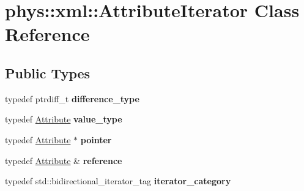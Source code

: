 \hypertarget{classphys_1_1xml_1_1AttributeIterator}{
\section{phys::xml::AttributeIterator Class Reference}
\label{de/d78/classphys_1_1xml_1_1AttributeIterator}
}
\subsection*{Public Types}
\begin{DoxyCompactItemize}
\item 
\hypertarget{classphys_1_1xml_1_1AttributeIterator_a04d891c0ff2a2122b8122dd872e4237e}{
typedef ptrdiff\_\-t {\bfseries difference\_\-type}}
\label{de/d78/classphys_1_1xml_1_1AttributeIterator_a04d891c0ff2a2122b8122dd872e4237e}

\item 
\hypertarget{classphys_1_1xml_1_1AttributeIterator_a686c1153e4f2c76a47b9160751cf4ebf}{
typedef \hyperlink{classphys_1_1xml_1_1Attribute}{Attribute} {\bfseries value\_\-type}}
\label{de/d78/classphys_1_1xml_1_1AttributeIterator_a686c1153e4f2c76a47b9160751cf4ebf}

\item 
\hypertarget{classphys_1_1xml_1_1AttributeIterator_ab145be8859ba19f330b0e784343499e8}{
typedef \hyperlink{classphys_1_1xml_1_1Attribute}{Attribute} $\ast$ {\bfseries pointer}}
\label{de/d78/classphys_1_1xml_1_1AttributeIterator_ab145be8859ba19f330b0e784343499e8}

\item 
\hypertarget{classphys_1_1xml_1_1AttributeIterator_a9227aa824303a24a85124db7af006511}{
typedef \hyperlink{classphys_1_1xml_1_1Attribute}{Attribute} \& {\bfseries reference}}
\label{de/d78/classphys_1_1xml_1_1AttributeIterator_a9227aa824303a24a85124db7af006511}

\item 
\hypertarget{classphys_1_1xml_1_1AttributeIterator_aa34a1f322d8b952c25b52722db453d34}{
typedef std::bidirectional\_\-iterator\_\-tag {\bfseries iterator\_\-category}}
\label{de/d78/classphys_1_1xml_1_1AttributeIterator_aa34a1f322d8b952c25b52722db453d34}

\end{DoxyCompactItemize}
